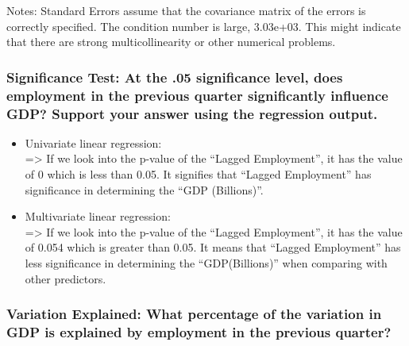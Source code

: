 \documentclass[11pt]{article}
\begin{document}
Notes: \newline
 [1] Standard Errors assume that the covariance matrix of the errors is correctly specified. \newline
 [2] The condition number is large, 3.03e+03. This might indicate that there are \newline
 strong multicollinearity or other numerical problems.

    

    \hypertarget{significance-test-at-the-.05-significance-level-does-employment-in-the-previous-quarter-significantly-influence-gdp-support-your-answer-using-the-regression-output.}{%
\subsubsection{Significance Test: At the .05 significance level, does
employment in the previous quarter significantly influence GDP? Support
your answer using the regression
output.}\label{significance-test-at-the-.05-significance-level-does-employment-in-the-previous-quarter-significantly-influence-gdp-support-your-answer-using-the-regression-output.}}

\begin{itemize}
\item
  Univariate linear regression:\\
  =\textgreater{} If we look into the p-value of the ``Lagged
  Employment'', it has the value of 0 which is less than 0.05. It
  signifies that ``Lagged Employment'' has significance in determining
  the ``GDP (Billions)''.
\item
  Multivariate linear regression:\\
  =\textgreater{} If we look into the p-value of the ``Lagged
  Employment'', it has the value of 0.054 which is greater than 0.05. It
  means that ``Lagged Employment'' has less significance in determining
  the ``GDP(Billions)'' when comparing with other predictors.
\end{itemize}

    \hypertarget{variation-explained-what-percentage-of-the-variation-in-gdp-is-explained-by-employment-in-the-previous-quarter}{%
\subsubsection{Variation Explained: What percentage of the variation in
GDP is explained by employment in the previous
quarter?}\label{variation-explained-what-percentage-of-the-variation-in-gdp-is-explained-by-employment-in-the-previous-quarter}}
\end{document}
